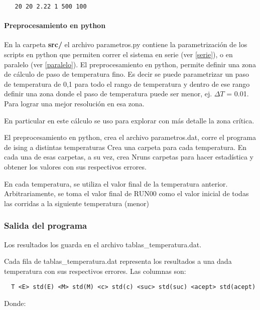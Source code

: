 \begin{verbatim}
   20 20 2.22 1 500 100
\end{verbatim}


\paragraph{Preprocesamiento en python}
En la carpeta \textbf{src/} el archivo parametros.py contiene la parametrizaci\'on 
de los scripts
en python que permiten correr el sistema en serie (ver \ref{serie}), 
o en paralelo (ver \ref{paralelo}).
El preprocesamiento en python, permite definir una zona de c\'alculo de paso
de temperatura fino. Es decir se puede parametrizar un paso de temperatura de
0,1 para todo el rango de temperatura y dentro de ese rango definir una zona
donde el paso de temperatura puede ser menor, ej. $\Delta T$ = 0.01. Para lograr una mejor resoluci\'on
en esa zona.

En particular en este c\'alculo se uso para explorar con m\'as detalle la zona
cr\'itica.

El preprocesamiento en python, crea el archivo parametros.dat, 
 corre el programa de ising a distintas temperaturas
  Crea una carpeta para cada temperatura. En cada una de esas carpetas, a su
  vez, crea Nruns carpetas para hacer estadística y obtener los valores con
  sus respectivos errores.
 
  En cada temperatura, se utiliza el valor final de la temperatura anterior.
  Arbitrariamente, se toma el valor final de RUN00 como el valor inicial de
  todas las corridas a la siguiente temperatura (menor)
 

\subsubsection{Salida del programa}

Los resultados los guarda en el archivo tablas\_temperatura.dat.

Cada fila de tablas\_temperatura.dat representa los resultados a una dada
temperatura con sus respectivos errores. Las columnas son:

\begin{verbatim}
  T <E> std(E) <M> std(M) <c> std(c) <suc> std(suc) <acept> std(acept)
\end{verbatim}

Donde:



